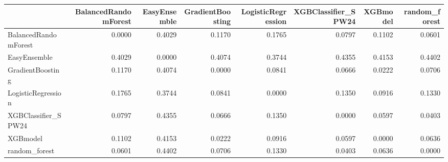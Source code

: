 \begin{tabular}{lrrrrrrr}
\toprule
 & BalancedRandomForest & EasyEnsemble & GradientBoosting & LogisticRegression & XGBClassifier_SPW24 & XGBmodel & random_forest \\
\midrule
BalancedRandomForest & 0.0000 & 0.4029 & 0.1170 & 0.1765 & 0.0797 & 0.1102 & 0.0601 \\
EasyEnsemble & 0.4029 & 0.0000 & 0.4074 & 0.3744 & 0.4355 & 0.4153 & 0.4402 \\
GradientBoosting & 0.1170 & 0.4074 & 0.0000 & 0.0841 & 0.0666 & 0.0222 & 0.0706 \\
LogisticRegression & 0.1765 & 0.3744 & 0.0841 & 0.0000 & 0.1350 & 0.0916 & 0.1330 \\
XGBClassifier_SPW24 & 0.0797 & 0.4355 & 0.0666 & 0.1350 & 0.0000 & 0.0597 & 0.0403 \\
XGBmodel & 0.1102 & 0.4153 & 0.0222 & 0.0916 & 0.0597 & 0.0000 & 0.0636 \\
random_forest & 0.0601 & 0.4402 & 0.0706 & 0.1330 & 0.0403 & 0.0636 & 0.0000 \\
\bottomrule
\end{tabular}
